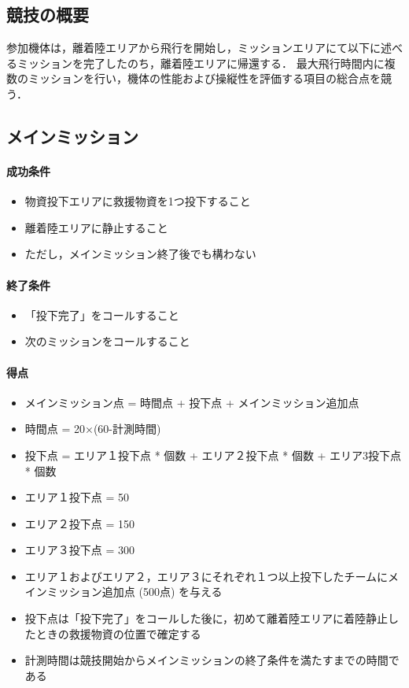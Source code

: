 \subsection{競技の概要}
参加機体は，離着陸エリアから飛行を開始し，ミッションエリアにて以下に述べるミッションを完了したのち，離着陸エリアに帰還する．
最大飛行時間内に複数のミッションを行い，機体の性能および操縦性を評価する項目の総合点を競う．
\subsection{メインミッション}
\paragraph{成功条件}
\begin{itemize}
\item 物資投下エリアに救援物資を1つ投下すること
\item 離着陸エリアに静止すること
  \item ただし，メインミッション終了後でも構わない
\end{itemize}
\paragraph{終了条件}
\begin{itemize}
\item 「投下完了」をコールすること
\item 次のミッションをコールすること
\end{itemize}
\paragraph{得点}
\begin{itemize}
\item メインミッション点 = 時間点 + 投下点 + メインミッション追加点
\item 時間点 = 20×(60-計測時間)
\item 投下点 = エリア１投下点 * 個数 + エリア２投下点 * 個数 + エリア3投下点 * 個数
\item エリア１投下点 = 50
\item エリア２投下点 = 150
\item エリア３投下点 = 300
\item エリア１およびエリア２，エリア３にそれぞれ１つ以上投下したチームにメインミッション追加点 (500点) を与える
\item 投下点は「投下完了」をコールした後に，初めて離着陸エリアに着陸静止したときの救援物資の位置で確定する
\item 計測時間は競技開始からメインミッションの終了条件を満たすまでの時間である
\end{itemize}
